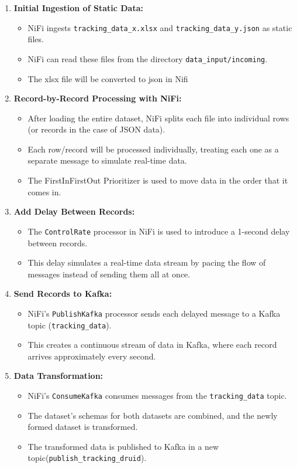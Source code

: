 \documentclass{article}
\begin{document}
\begin{enumerate}
    \item \textbf{Initial Ingestion of Static Data:}
    \begin{itemize}
        \item NiFi ingests \texttt{tracking\_data\_x.xlsx} and \texttt{tracking\_data\_y.json} as static files.
        \item NiFi can read these files from the directory \texttt{data\_input/incoming}.
        \item The xlsx file will be converted to json in Nifi
    \end{itemize}

    \item \textbf{Record-by-Record Processing with NiFi:}
    \begin{itemize}
        \item After loading the entire dataset, NiFi splits each file into individual rows (or records in the case of JSON data).
        \item Each row/record will be processed individually, treating each one as a separate message to simulate real-time data.
        \item The FirstInFirstOut Prioritizer is used to move data in the order that it comes in.
    \end{itemize}

    \item \textbf{Add Delay Between Records:}
    \begin{itemize}
        \item The \texttt{ControlRate} processor in NiFi is used to introduce a 1-second delay between records.
        \item This delay simulates a real-time data stream by pacing the flow of messages instead of sending them all at once.
    \end{itemize}

    \item \textbf{Send Records to Kafka:}
    \begin{itemize}
        \item NiFi’s \texttt{PublishKafka} processor sends each delayed message to a Kafka topic (\texttt{tracking\_data}).
        \item This creates a continuous stream of data in Kafka, where each record arrives approximately every second.
    \end{itemize}

    \item \textbf{Data Transformation:}
    \begin{itemize}
        \item NiFi's \texttt{ConsumeKafka} consumes messages from the \texttt{tracking\_data} topic.
        \item The dataset's schemas for both datasets are combined, and the newly formed dataset is transformed.
        \item The transformed data is published to Kafka in a new topic(\texttt{publish\_tracking\_druid}).
    \end{itemize}


\end{enumerate}
\end{document}
